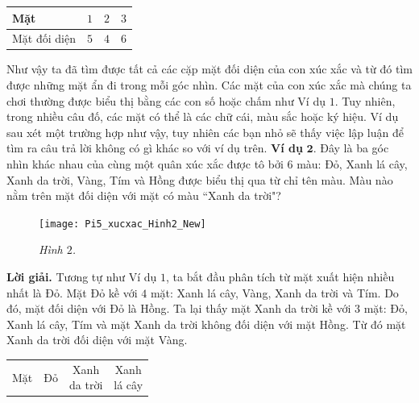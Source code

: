 \begin{multicols}{2}
\begin{table}[H]
		\renewcommand{\arraystretch}{1.2}
		\begin{tabular}{|l|c|c|c|}
			\hline
			Mặt	&$1$&	$2$&	$3$\\
			\hline
			Mặt đối diện&	$5$	&$4$&	$6$\\
			\hline
		\end{tabular}
	\vspace*{-5pt}
	\end{table}
	Như vậy ta đã tìm được tất cả các cặp mặt đối diện của con xúc xắc và từ đó tìm được những mặt ẩn đi trong mỗi góc nhìn.
	\vskip 0.1cm
	Các mặt của con xúc xắc mà chúng ta chơi thường được biểu thị bằng các con số hoặc chấm như Ví dụ $1$. Tuy nhiên, trong nhiều câu đố, các mặt có thể là các chữ cái, màu sắc hoặc ký hiệu. Ví dụ sau xét một trường hợp như vậy, tuy nhiên các bạn nhỏ sẽ thấy việc lập luận để tìm ra câu trả lời không có gì khác so với ví dụ trên.
	\vskip 0.1cm
	\textbf{\color{toancuabi}Ví dụ} $\pmb{2.}$ Đây là ba góc nhìn khác nhau của cùng một quân xúc xắc được tô bởi $6$ màu: {\color{red}Đỏ}, {\color{green}Xanh lá cây}, {\color{blue}Xanh da trời}, {\color{yellow}Vàng}, {\color{gocco}Tím} và {\color{toancuabi}Hồng} được biểu thị qua từ chỉ tên màu. Màu nào nằm trên mặt đối diện với mặt có màu ``Xanh da trời"?
	\begin{figure}[H]
		\vspace*{-5pt}
		\centering
		\captionsetup{labelformat= empty, justification=centering}
		\texttt{[image: Pi5\_xucxac\_Hinh2\_New]}
		\caption{\small\textit{\color{toancuabi}Hình $2$.}}
		\vspace*{-10pt}
	\end{figure}
	\textbf{\color{toancuabi}Lời giải.} Tương tự như Ví dụ $1$, ta bắt đầu phân tích từ mặt xuất hiện nhiều nhất là {\color{red}Đỏ}. Mặt {\color{red}Đỏ} kề với $4$ mặt: {\color{green}Xanh lá cây}, {\color{yellow}Vàng}, {\color{blue}Xanh da trời} và {\color{gocco}Tím}. Do đó, mặt đối diện với {\color{red}Đỏ} là {\color{toancuabi}Hồng}. Ta lại thấy mặt {\color{blue}Xanh da trời} kề với $3$ mặt: {\color{red}Đỏ}, {\color{green}Xanh lá cây}, {\color{gocco}Tím} và mặt {\color{blue}Xanh da trời} không đối diện với mặt {\color{toancuabi}Hồng}. Từ đó mặt {\color{blue}Xanh da trời} đối diện với mặt {\color{yellow}Vàng}.
	\begin{table}[H]
		\vspace*{-5pt}
		\centering
		\setlength{\tabcolsep}{7pt}
		\renewcommand{\arraystretch}{1.2}
		\begin{tabular}{|l|c|c|c|}
			\hline
			Mặt	& {\color{red}Đỏ}&	\makecell{\color{blue}Xanh\\ \color{blue}da trời}&	\makecell{\color{green}Xanh\\\color{green} lá cây}\\

\end{tabular}
\end{table}
\end{multicols}
